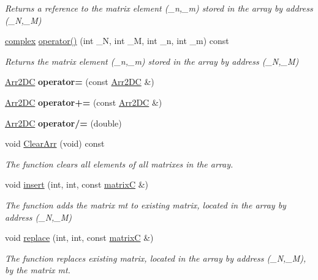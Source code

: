 \begin{DoxyCompactItemize}
\begin{DoxyCompactList}\small\item\em Returns a reference to the matrix element (\+\_\+n,\+\_\+m) stored in the array by address (\+\_\+N,\+\_\+M) \end{DoxyCompactList}\item 
\mbox{\label{class_arr2_d_c_ae0d60c322133c8d02061ce868e2c4237}} 
\mbox{\hyperlink{classcomplex}{complex}} \mbox{\hyperlink{class_arr2_d_c_ae0d60c322133c8d02061ce868e2c4237}{operator()}} (int \+\_\+N, int \+\_\+M, int \+\_\+n, int \+\_\+m) const
\begin{DoxyCompactList}\small\item\em Returns the matrix element (\+\_\+n,\+\_\+m) stored in the array by address (\+\_\+N,\+\_\+M) \end{DoxyCompactList}\item 
\mbox{\label{class_arr2_d_c_a385a829ab17f41659c9c8b81001d99e9}} 
\mbox{\hyperlink{class_arr2_d_c}{Arr2\+DC}} {\bfseries operator=} (const \mbox{\hyperlink{class_arr2_d_c}{Arr2\+DC}} \&)
\item 
\mbox{\label{class_arr2_d_c_a64a89bc8584759413ebf7400292b07e7}} 
\mbox{\hyperlink{class_arr2_d_c}{Arr2\+DC}} {\bfseries operator+=} (const \mbox{\hyperlink{class_arr2_d_c}{Arr2\+DC}} \&)
\item 
\mbox{\label{class_arr2_d_c_a99905b8eca91dcea3d97573079d9e691}} 
\mbox{\hyperlink{class_arr2_d_c}{Arr2\+DC}} {\bfseries operator/=} (double)
\item 
\mbox{\label{class_arr2_d_c_ace531436136bd775bedd029e5824d3d9}} 
void \mbox{\hyperlink{class_arr2_d_c_ace531436136bd775bedd029e5824d3d9}{Clear\+Arr}} (void) const
\begin{DoxyCompactList}\small\item\em The function clears all elements of all matrixes in the array. \end{DoxyCompactList}\item 
void \mbox{\hyperlink{class_arr2_d_c_a1d194f079eb8127bcbe0b4c22779ec3e}{insert}} (int, int, const \mbox{\hyperlink{classmatrix_c}{matrixC}} \&)
\begin{DoxyCompactList}\small\item\em The function adds the matrix mt to existing matrix, located in the array by address (\+\_\+N,\+\_\+M) \end{DoxyCompactList}\item 
void \mbox{\hyperlink{class_arr2_d_c_ac2aaaee7f4c38e61f1344565cc41d7f0}{replace}} (int, int, const \mbox{\hyperlink{classmatrix_c}{matrixC}} \&)
\begin{DoxyCompactList}\small\item\em The function replaces existing matrix, located in the array by address (\+\_\+N,\+\_\+M), by the matrix mt. \end{DoxyCompactList}\end{DoxyCompactItemize}
